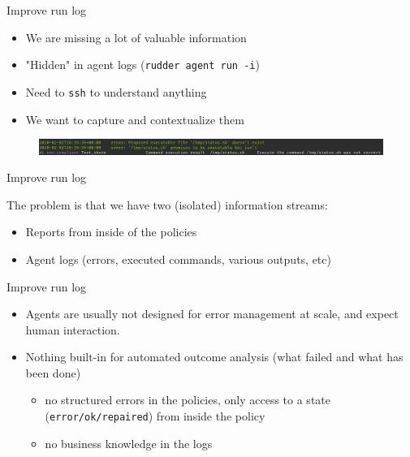 \documentclass[aspectratio=169, 14pt]{beamer}
\begin{document}
\begin{frame}{Improve run log}

	\begin{itemize}
		\item We are missing a lot of valuable information
		\item "Hidden" in agent logs (\texttt{rudder agent run -i})
		\item Need to \texttt{ssh} to understand anything
		\item We want to capture and contextualize them
	\end{itemize}
\end{frame}


\begin{frame}
	\begin{figure}
		\begin{center}
			\includegraphics[width=400pt]{output.png}
		\end{center}
	\end{figure}
\end{frame}

\begin{frame}{Improve run log}

	The problem is that we have two (isolated) information streams:

	\begin{itemize}
		\item Reports from inside of the policies
		\item Agent logs (errors, executed commands, various outputs, etc)
	\end{itemize}
	

\end{frame}	
	\begin{frame}{Improve run log}
	\begin{itemize}
		\item Agents are usually not designed for error management at scale,
	and expect human interaction.
		\item Nothing built-in for automated outcome analysis (what failed and what has been done)
		      \begin{itemize}
			      \item no structured errors in the policies, only access to a state (\texttt{error/ok/repaired}) from inside the policy
			      \item no business knowledge in the logs
		      \end{itemize}
	\end{itemize}
\end{frame}
\end{document}
